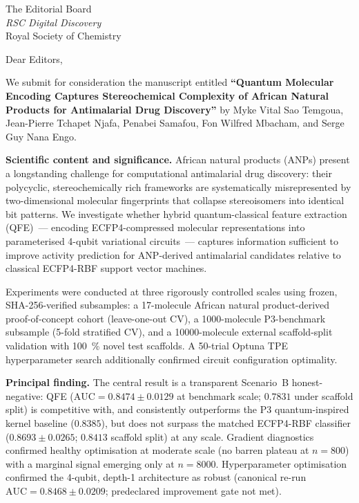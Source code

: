 \documentclass[11pt,a4paper]{letter}
\date{\today}
\begin{document}
\begin{letter}{The Editorial Board\\
  \textit{RSC Digital Discovery}\\
  Royal Society of Chemistry}

\opening{Dear Editors,}

We submit for consideration the manuscript entitled \textbf{``Quantum Molecular
Encoding Captures Stereochemical Complexity of African Natural Products for
Antimalarial Drug Discovery''} by Myke Vital Sao Temgoua, Jean-Pierre Tchapet
Njafa, Penabei Samafou, Fon Wilfred Mbacham, and Serge Guy Nana Engo.

\textbf{Scientific content and significance.}
African natural products (ANPs) present a longstanding challenge for
computational antimalarial drug discovery: their polycyclic, stereochemically
rich frameworks are systematically misrepresented by two-dimensional molecular
fingerprints that collapse stereoisomers into identical bit patterns. We
investigate whether hybrid quantum-classical feature extraction (QFE)~---
encoding ECFP4-compressed molecular representations into parameterised 4-qubit
variational circuits~--- captures information sufficient to improve activity
prediction for ANP-derived antimalarial candidates relative to classical ECFP4-RBF
support vector machines.

Experiments were conducted at three rigorously controlled scales using frozen,
SHA-256-verified subsamples: a 17-molecule African natural product-derived
proof-of-concept cohort (leave-one-out CV), a \num{1000}-molecule P3-benchmark
subsample (5-fold stratified CV), and a \num{10000}-molecule external
scaffold-split validation with \qty{100}{\percent} novel test scaffolds. A
50-trial Optuna TPE hyperparameter search additionally confirmed circuit
configuration optimality.

\textbf{Principal finding.}
The central result is a transparent Scenario~B honest-negative: QFE
($\text{AUC} = 0.8474 \pm 0.0129$ at benchmark scale; $0.7831$ under scaffold
split) is competitive with, and consistently outperforms the P3 quantum-inspired
kernel baseline ($0.8385$), but does not surpass the matched ECFP4-RBF classifier
($0.8693 \pm 0.0265$; $0.8413$ scaffold split) at any scale. Gradient diagnostics
confirmed healthy optimisation at moderate scale (no barren plateau at $n = 800$)
with a marginal signal emerging only at $n = 8000$. Hyperparameter optimisation
confirmed the 4-qubit, depth-1 architecture as robust (canonical re-run
$\text{AUC} = 0.8468 \pm 0.0209$; predeclared improvement gate not met).


\end{letter}
\end{document}
